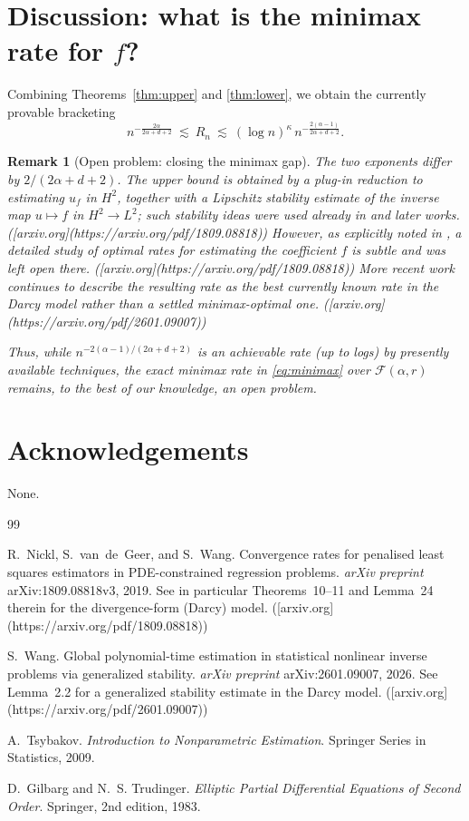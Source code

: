 \documentclass[11pt]{article}
\newtheorem{remark}{Remark}
\begin{document}
\section{Discussion: what is the minimax rate for $f$?}

Combining Theorems~\ref{thm:upper} and \ref{thm:lower}, we obtain the currently provable bracketing
\[
n^{-\frac{2\alpha}{2\alpha+d+2}}
\ \lesssim\ 
R_n
\ \lesssim\
(\log n)^{\kappa}\,n^{-\frac{2(\alpha-1)}{2\alpha+d+2}}.
\]

\begin{remark}[Open problem: closing the minimax gap]
The two exponents differ by $2/(2\alpha+d+2)$. 
The upper bound is obtained by a plug-in reduction to estimating $u_f$ in $H^2$, together with a Lipschitz stability estimate of the inverse map $u\mapsto f$ in $H^2\to L^2$; such stability ideas were used already in \cite{NVW2019} and later works. ([arxiv.org](https://arxiv.org/pdf/1809.08818))
However, as explicitly noted in \cite[discussion after Theorem 11]{NVW2019}, a detailed study of \emph{optimal} rates for estimating the coefficient $f$ is subtle and was left open there. ([arxiv.org](https://arxiv.org/pdf/1809.08818))
More recent work continues to describe the resulting rate as the \emph{best currently known} rate in the Darcy model rather than a settled minimax-optimal one. ([arxiv.org](https://arxiv.org/pdf/2601.09007))

Thus, while $n^{-2(\alpha-1)/(2\alpha+d+2)}$ is an achievable rate (up to logs) by presently available techniques, the exact minimax rate in \eqref{eq:minimax} over $\mathcal F(\alpha,r)$ remains, to the best of our knowledge, an open problem.
\end{remark}

\section*{Acknowledgements}
None.

\begin{thebibliography}{99}

R.~Nickl, S.~van~de~Geer, and S.~Wang.
\newblock Convergence rates for penalised least squares estimators in {PDE}-constrained regression problems.
\newblock \emph{arXiv preprint} arXiv:1809.08818v3, 2019.
\newblock See in particular Theorems~10--11 and Lemma~24 therein for the divergence-form (Darcy) model. ([arxiv.org](https://arxiv.org/pdf/1809.08818))

\bibitem{Wang2026}
S.~Wang.
\newblock Global polynomial-time estimation in statistical nonlinear inverse problems via generalized stability.
\newblock \emph{arXiv preprint} arXiv:2601.09007, 2026.
\newblock See Lemma~2.2 for a generalized stability estimate in the Darcy model. ([arxiv.org](https://arxiv.org/pdf/2601.09007))

\bibitem{Tsybakov2009}
A.~Tsybakov.
\newblock \emph{Introduction to Nonparametric Estimation}.
\newblock Springer Series in Statistics, 2009.

D.~Gilbarg and N.~S. Trudinger.
\newblock \emph{Elliptic Partial Differential Equations of Second Order}.
\newblock Springer, 2nd edition, 1983.

\end{thebibliography}
\end{document}
